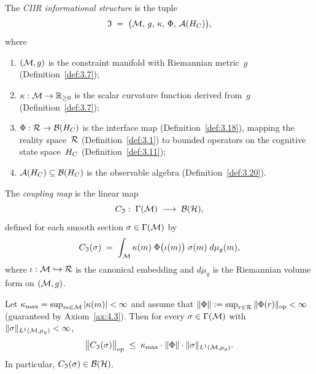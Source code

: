 \begin{definition}
\label{def:10.4}
The \emph{CIIR informational structure} is the tuple
\[
  \mathfrak{I}
  \;=\;
  \bigl(\mathcal{M},\,g,\,\kappa,\,\Phi,\,\mathcal{A}(H_C)\bigr),
\]
where
\begin{enumerate}
  \item $(\mathcal{M},g)$ is the constraint manifold with Riemannian metric~$g$
        (Definition~\ref{def:3.7});
  \item $\kappa:\mathcal{M}\to\mathbb{R}_{\geq 0}$ is the scalar curvature
        function derived from~$g$ (Definition~\ref{def:3.7});
  \item $\Phi:\mathcal{R}\to\mathcal{B}(H_C)$ is the interface map
        (Definition~\ref{def:3.18}), mapping the reality space~$\mathcal{R}$
        (Definition~\ref{def:3.1}) to bounded operators on the
        cognitive state space~$H_C$ (Definition~\ref{def:3.11});
  \item $\mathcal{A}(H_C)\subseteq\mathcal{B}(H_C)$ is the observable algebra
        (Definition~\ref{def:3.20}).
\end{enumerate}
\end{definition}

\begin{definition}
\label{def:10.5}
The \emph{coupling map} is the linear map
\[
  C_{\mathfrak{I}}
  :\;
  \Gamma(\mathcal{M})
  \;\longrightarrow\;
  \mathcal{B}(\mathcal{H}),
\]
defined for each smooth section $\sigma\in\Gamma(\mathcal{M})$ by
\begin{equation}
\label{eq:10.coupling}
  C_{\mathfrak{I}}(\sigma)
  \;=\;
  \int_{\mathcal{M}}
  \kappa(m)\;\Phi\bigl(\iota(m)\bigr)\;
  \sigma(m)\;
  d\mu_g(m),
\end{equation}
where $\iota:\mathcal{M}\hookrightarrow\mathcal{R}$ is the canonical embedding and
$d\mu_g$ is the Riemannian volume form on $(\mathcal{M},g)$.
\end{definition}

\begin{theorem}
\label{thm:10.1}
Let $\kappa_{\max}=\sup_{m\in\mathcal{M}}|\kappa(m)|<\infty$ and assume that
$\|\Phi\|:=\sup_{r\in\mathcal{R}}\|\Phi(r)\|_{\mathrm{op}}<\infty$
(guaranteed by Axiom~\ref{ax:4.3}).  Then for every
$\sigma\in\Gamma(\mathcal{M})$ with $\|\sigma\|_{L^1(\mathcal{M},\mu_g)}<\infty$,
\[
  \bigl\|C_{\mathfrak{I}}(\sigma)\bigr\|_{\mathrm{op}}
  \;\leq\;
  \kappa_{\max}\cdot\|\Phi\|\cdot\|\sigma\|_{L^1(\mathcal{M},\mu_g)}.
\]
In particular, $C_{\mathfrak{I}}(\sigma)\in\mathcal{B}(\mathcal{H})$.
\end{theorem}

